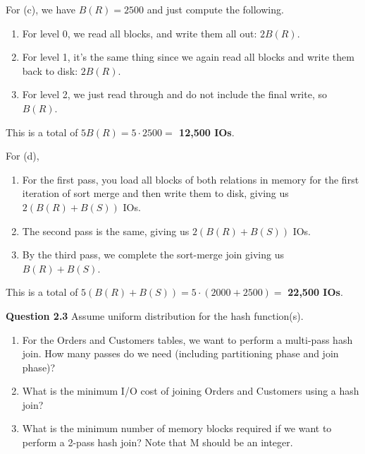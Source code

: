 \documentclass{article}
\begin{document}
\begin{example}
      For (c), we have $B(R) = 2500$ and just compute the following. 
      \begin{enumerate}
        \item For level $0$, we read all blocks, and write them all out: $2 B(R)$. 
        \item For level 1, it's the same thing since we again read all blocks and write them back to disk: $2 B(R)$. 
        \item For level 2, we just read through and do not include the final write, so $B(R)$.
      \end{enumerate}
      This is a total of \textbf{$5 B(R) = 5 \cdot 2500 =$ 12,500 IOs}. 

      For (d), 
      \begin{enumerate}
        \item For the first pass, you load all blocks of both relations in memory for the first iteration of sort merge and then write them to disk, giving us $2 (B(R) + B(S))$ IOs. 
        \item The second pass is the same, giving us $2 (B(R) + B(S))$ IOs. 
        \item By the third pass, we complete the sort-merge join giving us $B(R) + B(S)$. 
      \end{enumerate}
      This is a total of $5 (B(R) + B(S)) = 5 \cdot (2000 + 2500) =$ \textbf{22,500 IOs}. 

      \vspace{1em}
      \noindent\textbf{Question 2.3}
      Assume uniform distribution for the hash function(s).
      \begin{enumerate}[label=(\alph*)]
          \item For the Orders and Customers tables, we want to perform a multi-pass hash join. How many passes do we need (including partitioning phase and join phase)?
          
          \item What is the minimum I/O cost of joining Orders and Customers using a hash join?
          
          \item What is the minimum number of memory blocks required if we want to perform a 2-pass hash join? Note that M should be an integer.
      \end{enumerate}


\end{example}
\end{document}
